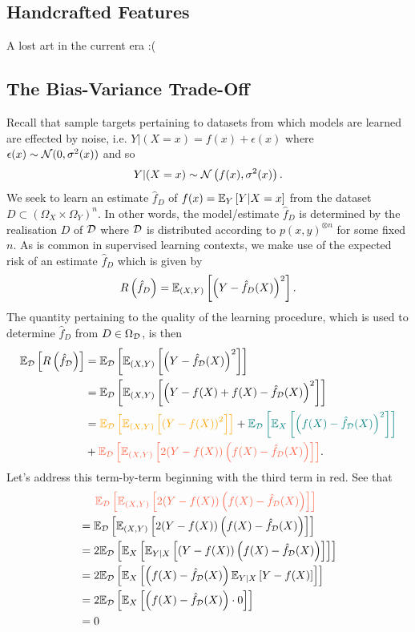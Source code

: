 \documentclass[11pt]{article}
\begin{document}
\subsection{Handcrafted Features}
A lost art in the current era :(

\subsection{The Bias-Variance Trade-Off}
Recall that sample targets pertaining to datasets from which models are learned are effected by noise, i.e. $Y|(X=x)=f(x)+\epsilon(x)$ where $\epsilon(x)\sim\mathcal{N}(0,\sigma^2(x))$ and so
$$
Y|(X=x)
\sim
\mathcal{N}\left(f(x), \sigma^2(x)\right).
$$
We seek to learn an estimate $\hat{f}_{D}$ of $f(x)=\mathbb{E}_Y\left[Y|X=x\right]$ from the dataset $D\subset(\Omega_X\times\Omega_Y)^n$. In other words, the model/estimate $\hat{f}_{D}$ is determined by the realisation $D$ of $\mathcal{D}$ where $\mathcal{D}$ is distributed according to $p(x,y)^{\otimes n}$ for some fixed $n$. As is common in supervised learning contexts, we make use of the expected risk of an estimate $\hat{f}_D$ which is given by
$$
R\left(\hat{f}_D\right)
=
\mathbb{E}_{(X,Y)}\left[\left(Y-\hat{f}_D(X)\right)^2\right].
$$
The quantity pertaining to the quality of the learning procedure, which is used to determine $\hat{f}_{D}$ from $D\in\Omega_{\mathcal{D}}$, is then
\begin{align*}
    \E_{\D}\l[R\l(\hat{f}_{\D}\r)\r]
    &=
    \E_{\D}\l[\E_{(X,Y)}\l[\l(Y-\hat{f}_{\D}(X)\r)^2\r]\r]\nonumber\\
    &=
    \E_{\D}\l[\E_{(X,Y)}\l[\l(Y-f(X)+f(X)-\hat{f}_{\D}(X)\r)^2\r]\r]\nonumber\\
    &=
    \textcolor{c5}{\E_{\D}\l[\E_{(X,Y)}\l[\l(Y-f(X)\r)^2\r]\r]}+
    \textcolor{c11}{\E_{\D}\l[\E_X\l[\l(f(X)-\hat{f}_{\D}(X)\r)^2\r]\r]}\\
    &+\textcolor{c3}{\E_{\D}\l[\E_{(X,Y)}\l[2(Y-f(X))\l(f(X)-\hat{f}_{\D}(X)\r)\r]\r]}.
\end{align*}
Let's address this term-by-term beginning with the third term in red. See that
\begin{align*}
    &\hspace{14.52pt}
    \textcolor{c3}{\E_{\D}\l[\E_{(X,Y)}\l[2(Y-f(X))\l(f(X)-\hat{f}_{\D}(X)\r)\r]\r]}\\
    &=
    \E_{\D}\l[\E_{(X,Y)}\l[2(Y-f(X))\l(f(X)-\hat{f}_{\D}(X)\r)\r]\r]\\
    &=
    2\E_{\D}\l[\E_X\l[\E_{Y|X}\l[(Y-f(X))\l(f(X)-\hat{f}_{\D}(X)\r)\r]\r]\r]\\
    &=
    2\E_{\D}\l[\E_X\l[\l(f(X)-\hat{f}_{\D}(X)\r)\E_{Y|X}\l[Y-f(X)\r]\r]\r]\\
    &=
    2\E_{\D}\l[\E_X\l[\l(f(X)-\hat{f}_{\D}(X)\r)\cdot0\r]\r]\\
    &=
    0
\end{align*}
\end{document}
